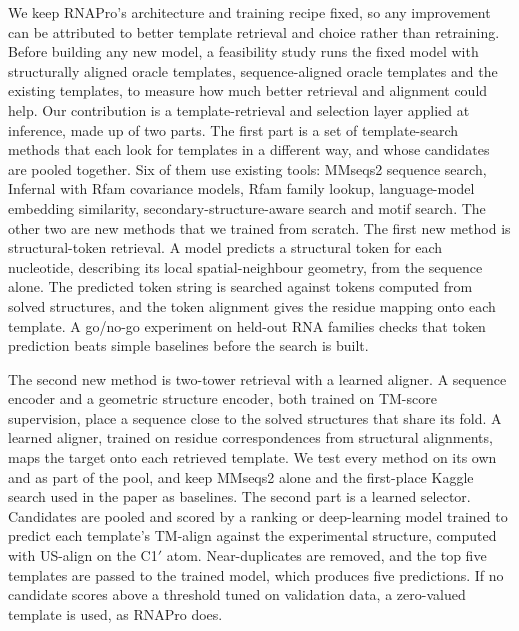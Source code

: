 \documentclass{FastFyp}
\begin{document}
We keep RNAPro's architecture and training recipe fixed, so any improvement can be attributed to better template retrieval and choice rather than retraining. Before building any new model, a feasibility study runs the fixed model with structurally aligned oracle templates, sequence-aligned oracle templates and the existing templates, to measure how much better retrieval and alignment could help. Our contribution is a template-retrieval and selection layer applied at inference, made up of two parts. The first part is a set of template-search methods that each look for templates in a different way, and whose candidates are pooled together. Six of them use existing tools: MMseqs2 sequence search, Infernal with Rfam covariance models, Rfam family lookup, language-model embedding similarity, secondary-structure-aware search and motif search. The other two are new methods that we trained from scratch. The first new method is structural-token retrieval. A model predicts a structural token for each nucleotide, describing its local spatial-neighbour geometry, from the sequence alone. The predicted token string is searched against tokens computed from solved structures, and the token alignment gives the residue mapping onto each template. A go/no-go experiment on held-out RNA families checks that token prediction beats simple baselines before the search is built.

The second new method is two-tower retrieval with a learned aligner. A sequence encoder and a geometric structure encoder, both trained on TM-score supervision, place a sequence close to the solved structures that share its fold. A learned aligner, trained on residue correspondences from structural alignments, maps the target onto each retrieved template. We test every method on its own and as part of the pool, and keep MMseqs2 alone and the first-place Kaggle search used in the paper as baselines. The second part is a learned selector. Candidates are pooled and scored by a ranking or deep-learning model trained to predict each template's TM-align against the experimental structure, computed with US-align on the C1$'$ atom. Near-duplicates are removed, and the top five templates are passed to the trained model, which produces five predictions. If no candidate scores above a threshold tuned on validation data, a zero-valued template is used, as RNAPro does.
\end{document}
